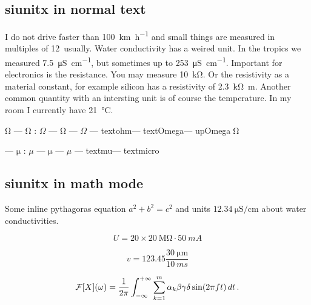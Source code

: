 \subsection{siunitx in normal text}

I do not drive faster than \SI{100}{\kilo\meter\per\hour} and small
things are measured in multiples of 12\,\micro\meter{} usually. Water
conductivity has a weired unit. In the tropics we measured
\SI{7.5}{\micro\siemens\per\centi\meter}, but sometimes up to
\SI{253}{\micro\siemens\per\centi\meter}. Important for electronics is the
resistance. You may measure \SI{10}{\kilo\ohm}. Or the resistivity as
a material constant, for example silicon has a resistivity of
\SI{2.3}{\kilo\ohm\meter}. Another common quantity with an intersting
unit is of course the temperature. In my room I currently have
\SI{21}{\degreeCelsius}.

\si{\ohm} --- $\si{\ohm}$ : $\Omega$ --- $\mathrm{\Omega}$ --- $\mathsf{\Omega}$ ---
\ifcsname textohm\endcsname\textohm\fi  --- \ifcsname textOmega\endcsname\textOmega\fi ---
\ifcsname upOmega\endcsname$\upOmega$\fi 

\si{\micro} --- $\si{\micro}$ : $\mu$ --- $\mathrm{\mu}$ --- $\mathsf{\mu}$ ---
\ifcsname textmu\endcsname\textmu\fi --- \ifcsname textmicro\endcsname\textmicro\fi

\subsection{siunitx in math mode}

Some inline pythagoras equation $a^2 + b^2 = c^2$ and units
$\SI{12.34}{\micro\siemens\per\centi\meter}$ about water
conductivities.

\[ U = 20 \times \SI{20}{\mega\ohm}\cdot\SI{50}{mA} \]

\[ v = 123.45 \frac{\SI{30}{\micro\meter}}{\SI{10}{ms}} \]

\[ {\cal F}[X](\omega) = \frac{1}{2\pi}\int_{-\infty}^{+\infty} \sum_{k=1}^m \alpha_k\beta\gamma\delta\sin(2\pi f t)\,dt\,. \]
